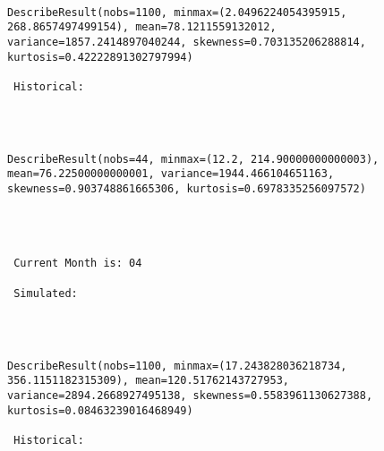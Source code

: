 \documentclass[11pt]{article}
\begin{document}
    \begin{center}
    \end{center}
    { \hspace*{\fill} \\}
    
    \begin{Verbatim}[commandchars=\\\{\}]
DescribeResult(nobs=1100, minmax=(2.0496224054395915, 268.8657497499154), mean=78.1211559132012, variance=1857.2414897040244, skewness=0.703135206288814, kurtosis=0.42222891302797994)

 Historical: 
 

    \end{Verbatim}

    \begin{center}
    \end{center}
    { \hspace*{\fill} \\}
    
    \begin{Verbatim}[commandchars=\\\{\}]
DescribeResult(nobs=44, minmax=(12.2, 214.90000000000003), mean=76.22500000000001, variance=1944.466104651163, skewness=0.903748861665306, kurtosis=0.6978335256097572) 



 
 Current Month is: 04

 Simulated: 
 

    \end{Verbatim}

    \begin{center}
    \end{center}
    { \hspace*{\fill} \\}
    
    \begin{Verbatim}[commandchars=\\\{\}]
DescribeResult(nobs=1100, minmax=(17.243828036218734, 356.1151182315309), mean=120.51762143727953, variance=2894.2668927495138, skewness=0.5583961130627388, kurtosis=0.08463239016468949)

 Historical: 
 

    \end{Verbatim}
\end{document}
